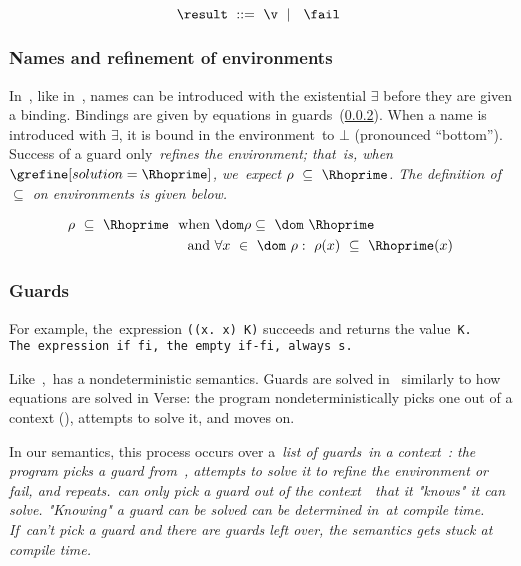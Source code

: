 \documentclass[manuscript,screen 12pt, nonacm]{acmart}
\begin{document}
    \[\result\;~\rm{::=}\;~\v\;~\vert~\;~\fail~\]
    

    \subsubsection{Names and refinement of environments}

    In~\VMinus, like in~\VC, names can be introduced with the existential
    {$\exists$} before they are given a binding. Bindings are given by equations
    in guards~(\ref{guards}). When a name is introduced with {$\exists$}, it is
    bound in the environment~\Rho to $\bot$ (pronounced “bottom”). Success of a
    guard only~\it{refines} the environment; that~is, when
    $\grefine[solution=\Rhoprime]$, we~expect $\rho~\subseteq~\Rhoprime$. The
    definition of $\subseteq$ on environments is given below. 
    
    \begin{align*}
    \rho~\subseteq~\Rhoprime~\text{ when }&\dom\rho  \subseteq~\dom~\Rhoprime\\
    \text{ and } &\forall x~\in~\dom~\rho:~\rho(x)~\subseteq~\Rhoprime(x)
    \end{align*}
    
    \medskip
        
    \subsubsection{Guards}
    \label{guards}

    For example, the~\VMinus expression {\tt{((}\ttbackslash\tt{x. x) K)}}
    succeeds and returns the value~\tt{K}. The~\VMinus expression~\tt{if  fi},
    the empty~\tt{if-fi}, always {\fail}s. 

    Like~\VC,~\VMinus has a nondeterministic semantics. Guards are solved in~\VMinus
    similarly to how equations are solved in Verse: the program nondeterministically
    picks one out of a context (\context), attempts to solve it, and moves on. 

In our semantics, this process occurs over a~\it{list} of guards~\gs in a
context~\context: the program picks a guard from~\context, attempts to solve it
to refine the environment or fail, and repeats.~\VMinus can only pick a guard
out of the context~\context\ that it "knows" it can solve. "Knowing" a guard can
be solved can be determined in~\VMinus at compile time. If~\VMinus can't pick a
guard and there are guards left over, the semantics gets stuck at compile time. 
\end{document}
